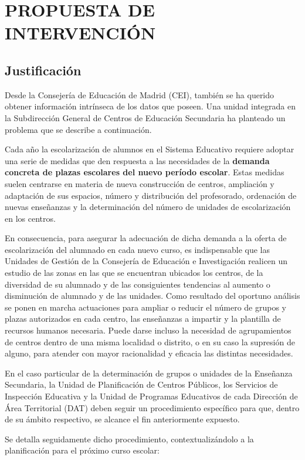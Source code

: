 \section{PROPUESTA DE INTERVENCIÓN}
\subsection{Justificación}
Desde la Consejería de Educación de Madrid (CEI), también se ha querido obtener información intrínseca de los datos que poseen. Una unidad integrada en la Subdirección General de Centros de Educación Secundaria ha planteado un problema que se describe a continuación.

Cada año la escolarización de alumnos en el Sistema Educativo requiere adoptar una serie de medidas que den respuesta a las necesidades de la \textbf{demanda concreta de plazas escolares del nuevo período escolar}. Estas medidas suelen centrarse en materia de nueva construcción de centros, ampliación y adaptación de sus espacios, número y distribución del profesorado, ordenación de nuevas enseñanzas y la determinación del número de unidades de escolarización en los centros.

En consecuencia, para asegurar la adecuación de dicha demanda a la oferta de escolarización del alumnado en cada nuevo curso, es indispensable que las Unidades de Gestión de la Consejería de Educación e Investigación realicen un estudio de las zonas en las que se encuentran ubicados los centros, de la diversidad de su alumnado y de las consiguientes tendencias al aumento o disminución de alumnado y de las unidades. Como resultado del oportuno análisis se ponen en marcha actuaciones para ampliar o reducir el número de grupos y plazas autorizados en cada centro, las enseñanzas a impartir y la plantilla de recursos humanos necesaria. Puede darse incluso la necesidad de agrupamientos de centros dentro de una misma localidad o distrito, o en su caso la supresión de alguno, para atender con mayor racionalidad y eficacia las distintas necesidades.

En el caso particular de la determinación de grupos o unidades de la Enseñanza Secundaria, la Unidad de Planificación de Centros Públicos, los Servicios de Inspección Educativa y la Unidad de Programas Educativos de cada Dirección de Área Territorial (DAT) deben seguir un procedimiento específico para que, dentro de su ámbito respectivo, se alcance el fin anteriormente expuesto. 

Se detalla seguidamente dicho procedimiento, contextualizándolo a la planificación para el próximo curso escolar: 


